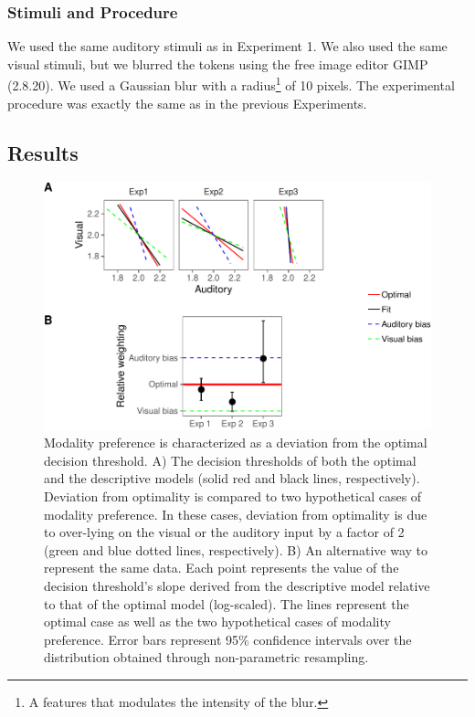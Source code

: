 \documentclass[english,,man,floatsintext]{apa6}
\let\rmarkdownfootnote\footnote%
\def\footnote{\protect\rmarkdownfootnote}
\theoremstyle{definition}
\theoremstyle{definition}
\theoremstyle{definition}
\theoremstyle{remark}
\begin{document}
\subsubsection{Stimuli and Procedure}\label{stimuli-and-procedure-1}

We used the same auditory stimuli as in Experiment 1. We also used the
same visual stimuli, but we blurred the tokens using the free image
editor GIMP (2.8.20). We used a Gaussian blur with a
radius\footnote{A features that modulates the intensity of the blur.} of
10 pixels. The experimental procedure was exactly the same as in the
previous Experiments.

\subsection{Results}\label{results-1}

\begin{figure}[!h]
\includegraphics[width=\textwidth]{ms_files/figure-latex/bias-1} \caption{Modality preference is characterized as a deviation from the optimal decision threshold. A) The decision thresholds of both the optimal and the descriptive models (solid red and black lines, respectively). Deviation from optimality is compared to two hypothetical cases of modality preference. In these cases, deviation from  optimality is due to over-lying on the visual or the auditory input by a factor of 2 (green and blue dotted lines, respectively). B) An alternative way to represent the same data. Each point represents the value of the decision threshold's slope derived from the descriptive model relative to that of the optimal model (log-scaled). The lines represent the optimal case as well as the two hypothetical cases of modality preference. Error bars represent 95\% confidence intervals over the distribution obtained through non-parametric resampling.}\label{fig:bias}
\end{figure}
\end{document}
